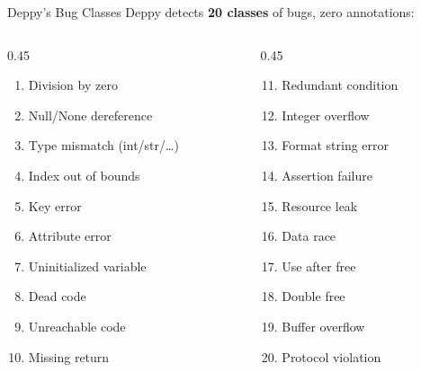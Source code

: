 \documentclass[aspectratio=169,10pt]{beamer}
\begin{document}
\begin{frame}{Deppy's Bug Classes}
Deppy detects \textbf{20 classes} of bugs, zero annotations:

\vspace{0.2em}
\footnotesize
\begin{columns}[T]
\begin{column}{0.45\textwidth}
\begin{enumerate}
  \item Division by zero
  \item Null/None dereference
  \item Type mismatch (int/str/\ldots)
  \item Index out of bounds
  \item Key error
  \item Attribute error
  \item Uninitialized variable
  \item Dead code
  \item Unreachable code
  \item Missing return
\end{enumerate}
\end{column}
\begin{column}{0.45\textwidth}
\begin{enumerate}\setcounter{enumi}{10}
  \item Redundant condition
  \item Integer overflow
  \item Format string error
  \item Assertion failure
  \item Resource leak
  \item Data race
  \item Use after free
  \item Double free
  \item Buffer overflow
  \item Protocol violation
\end{enumerate}
\end{column}
\end{columns}
\normalsize
\end{frame}
\end{document}
